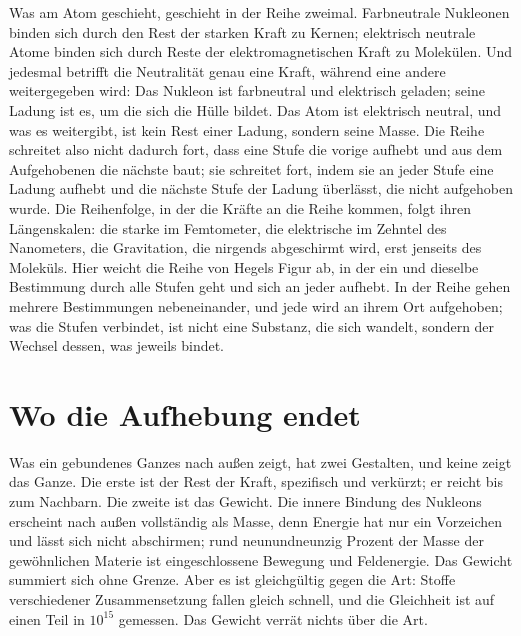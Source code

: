 \documentclass[11pt,a4paper]{article}
\begin{document}
Was am Atom geschieht, geschieht in der Reihe zweimal. Farbneutrale Nukleonen binden sich durch den Rest der starken Kraft zu Kernen; elektrisch neutrale Atome binden sich durch Reste der elektromagnetischen Kraft zu Molekülen. Und jedesmal betrifft die Neutralität genau eine Kraft, während eine andere weitergegeben wird: Das Nukleon ist farbneutral und elektrisch geladen; seine Ladung ist es, um die sich die Hülle bildet. Das Atom ist elektrisch neutral, und was es weitergibt, ist kein Rest einer Ladung, sondern seine Masse. Die Reihe schreitet also nicht dadurch fort, dass eine Stufe die vorige aufhebt und aus dem Aufgehobenen die nächste baut; sie schreitet fort, indem sie an jeder Stufe eine Ladung aufhebt und die nächste Stufe der Ladung überlässt, die nicht aufgehoben wurde. Die Reihenfolge, in der die Kräfte an die Reihe kommen, folgt ihren Längenskalen: die starke im Femtometer, die elektrische im Zehntel des Nanometers, die Gravitation, die nirgends abgeschirmt wird, erst jenseits des Moleküls. Hier weicht die Reihe von Hegels Figur ab, in der ein und dieselbe Bestimmung durch alle Stufen geht und sich an jeder aufhebt. In der Reihe gehen mehrere Bestimmungen nebeneinander, und jede wird an ihrem Ort aufgehoben; was die Stufen verbindet, ist nicht eine Substanz, die sich wandelt, sondern der Wechsel dessen, was jeweils bindet.

\section{Wo die Aufhebung endet}
\label{sec:grenze}

Was ein gebundenes Ganzes nach außen zeigt, hat zwei Gestalten, und keine zeigt das Ganze. Die erste ist der Rest der Kraft, spezifisch und verkürzt; er reicht bis zum Nachbarn. Die zweite ist das Gewicht. Die innere Bindung des Nukleons erscheint nach außen vollständig als Masse, denn Energie hat nur ein Vorzeichen und lässt sich nicht abschirmen; rund neunundneunzig Prozent der Masse der gewöhnlichen Materie ist eingeschlossene Bewegung und Feldenergie. Das Gewicht summiert sich ohne Grenze. Aber es ist gleichgültig gegen die Art: Stoffe verschiedener Zusammensetzung fallen gleich schnell, und die Gleichheit ist auf einen Teil in $10^{15}$ gemessen. Das Gewicht verrät nichts über die Art.
\end{document}
